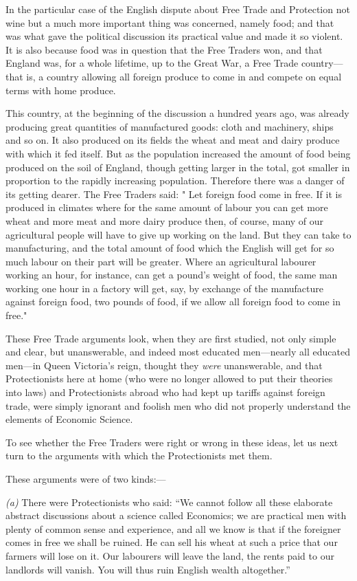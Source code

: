 \documentclass{book}
\begin{document}
In the particular case of the English dispute about Free Trade and Protection not wine but a much more important thing was concerned, namely food; and that was what gave the political discussion its practical value and made it so violent. It is also because food was in question that the Free Traders won, and that England was, for a whole lifetime, up to the Great War, a Free Trade country—that is, a country allowing all foreign produce to come in and compete on equal terms with home produce.

This country, at the beginning of the discussion a hundred years ago, was already producing great quantities of manufactured goods: cloth and machinery, ships and so on. It also produced on its fields the wheat and meat and dairy produce with which it fed itself. But as the population increased the amount of food being produced on the soil of England, though getting larger in the total, got smaller in proportion to the rapidly increasing population. Therefore there was a danger of its getting dearer. The Free Traders said: " Let foreign food come in free. If it is produced in climates where for the same amount of labour you can get more wheat and more meat and more dairy produce then, of course, many of our agricultural people will have to give up working on the land. But they can take to manufacturing, and the total amount of food which the English will get for so much labour on their part will be greater. Where an agricultural labourer working an hour, for instance, can get a pound’s weight of food, the same man working one hour in a factory will get, say, by exchange of the manufacture against foreign food, two pounds of food, if we allow all foreign food to come in free."

These Free Trade arguments look, when they are first studied, not only simple and clear, but unanswerable, and indeed most educated men—nearly all educated men—in Queen Victoria’s reign, thought they \emph{were} unanswerable, and that Protectionists here at home (who were no longer allowed to put their theories into laws) and Protectionists abroad who had kept up tariffs against foreign trade, were simply ignorant and foolish men who did not properly understand the elements of Economic Science.

To see whether the Free Traders were right or wrong in these ideas, let us next turn to the arguments with which the Protectionists met them.

These arguments were of two kinds:—

\emph{(a)} There were Protectionists who said: “We cannot follow all these elaborate abstract discussions about a science called Economics; we are practical men with plenty of common sense and experience, and all we know is that if the foreigner comes in free we shall be ruined. He can sell his wheat at such a price that our farmers will lose on it. Our labourers will leave the land, the rents paid to our landlords will vanish. You will thus ruin English wealth altogether.”
\end{document}
